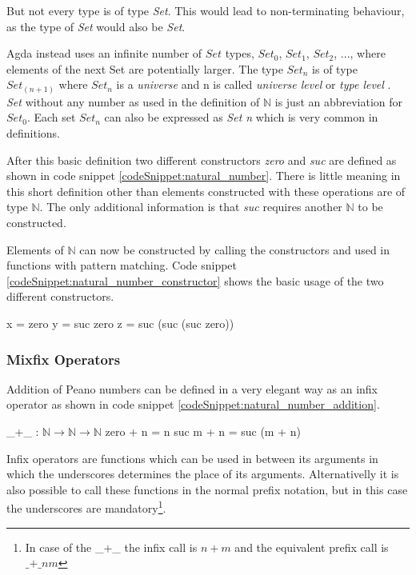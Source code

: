 But not every type is of type \emph{Set}. This would lead to non-terminating behaviour, as the type of \emph{Set} would also be \emph{Set}.

Agda instead uses an infinite number of $Set$ types, $Set_0$, $Set_1$, $Set_2$, ..., where elements of the next Set are potentially larger.
The type $Set_n$ is of type $Set_(n+1)$ where $Set_n$ is a \emph{universe} and n is called \emph{universe level} or \emph{type level} \cite{AgdaReadTheDocs, 10.1145/2841316}.
\emph{Set} without any number as used in the definition of $\mathbb{N}$ is just an abbreviation for $Set_0$. 
Each set $Set_n$ can also be expressed as \emph{Set n} which is very common in definitions.

After this basic definition two different constructors \emph{zero} and \emph{suc} are defined as shown in code snippet \ref{codeSnippet:natural_number}.
There is little meaning in this short definition other than elements constructed with these operations are of type $\mathbb{N}$.
The only additional information is that \emph{suc} requires another $\mathbb{N}$ to be constructed.

Elements of $\mathbb{N}$ can now be constructed by calling the constructors and used in functions with pattern matching. 
Code snippet \ref{codeSnippet:natural_number_constructor} shows the basic usage of the two different constructors.

\begin{codesnippet}[mathescape=true, caption={Some peano numbers}, label={codeSnippet:natural_number_constructor}]
x = zero
y = suc zero
z = suc (suc (suc zero))
\end{codesnippet}

\subsubsection{Mixfix Operators}
Addition of Peano numbers can be defined in a very elegant way as an infix operator as shown in code snippet \ref{codeSnippet:natural_number_addition}.

\begin{codesnippet}[mathescape=true, caption={Peano numbers addition}, label={codeSnippet:natural_number_addition}]
_+_ : $\mathbb{N} \rightarrow \mathbb{N} \rightarrow \mathbb{N}$
zero  + n = n
suc m + n = suc (m + n)
\end{codesnippet}

Infix operators are functions which can be used in between its arguments in which the underscores determines the place of its arguments.
Alternativelly it is also possible to call these functions in the normal prefix notation, but in this case the underscores are mandatory\footnote{In case of the \_+\_ the infix call is $n + m$ and the equivalent prefix call is $\text{\_+\_} n m$}.

